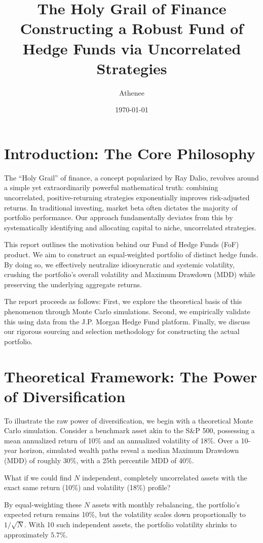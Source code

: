 \documentclass[11pt, a4paper]{article}
\title{\textbf{The Holy Grail of Finance}\\ \Large Constructing a Robust Fund of Hedge Funds via Uncorrelated Strategies}
\author{Athenee}
\date{\today}
\begin{document}
\maketitle

\section{Introduction: The Core Philosophy}
The ``Holy Grail'' of finance, a concept popularized by Ray Dalio, revolves around a simple yet extraordinarily powerful mathematical truth: combining uncorrelated, positive-returning strategies exponentially improves risk-adjusted returns. In traditional investing, market beta often dictates the majority of portfolio performance. Our approach fundamentally deviates from this by systematically identifying and allocating capital to niche, uncorrelated strategies.

This report outlines the motivation behind our Fund of Hedge Funds (FoF) product. We aim to construct an equal-weighted portfolio of distinct hedge funds. By doing so, we effectively neutralize idiosyncratic and systemic volatility, crushing the portfolio's overall volatility and Maximum Drawdown (MDD) while preserving the underlying aggregate returns. 

The report proceeds as follows: First, we explore the theoretical basis of this phenomenon through Monte Carlo simulations. Second, we empirically validate this using data from the J.P. Morgan Hedge Fund platform. Finally, we discuss our rigorous sourcing and selection methodology for constructing the actual portfolio.

\section{Theoretical Framework: The Power of Diversification}

To illustrate the raw power of diversification, we begin with a theoretical Monte Carlo simulation. Consider a benchmark asset akin to the S\&P 500, possessing a mean annualized return of 10\% and an annualized volatility of 18\%. Over a 10-year horizon, simulated wealth paths reveal a median Maximum Drawdown (MDD) of roughly 30\%, with a 25th percentile MDD of 40\%. 

What if we could find $N$ independent, completely uncorrelated assets with the exact same return (10\%) and volatility (18\%) profile?

By equal-weighting these $N$ assets with monthly rebalancing, the portfolio's expected return remains 10\%, but the volatility scales down proportionally to $1/\sqrt{N}$. With 10 such independent assets, the portfolio volatility shrinks to approximately $5.7\%$.
\end{document}

